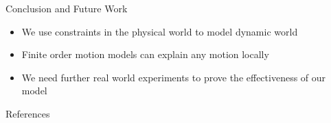 \documentclass[final]{beamer}
\newlength{\sepwid}
\newlength{\onecolwid}
\begin{document}
\begin{frame}[t]
\begin{columns}[t]
\begin{column}{\onecolwid}
      \begin{block}{Conclusion and Future Work}
        \begin{itemize}
          \item We use constraints in the physical world to model dynamic world
          \item Finite order motion models can explain any motion locally
          \item We need further real world experiments to prove the effectiveness of our model
        \end{itemize}
      \end{block}
      \begin{block}{References}
        \nocite{yaakov2001estimation}
        \nocite{cifuentes2012motion}
        \nocite{yan2006automatic}
        {\small
        
        
        }
      \end{block}
    \end{column}

  \begin{column}{\sepwid}\end{column}			%

  \end{columns}
\end{frame}
\end{document}
